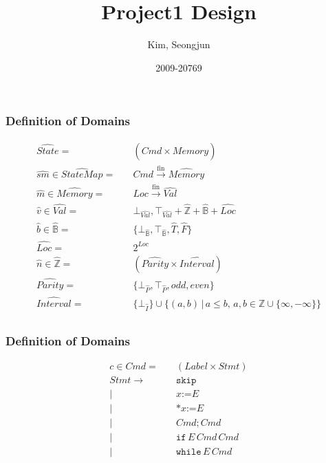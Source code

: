 \documentclass{beamer}
\title{Project1 Design}
\author{Kim, Seongjun}
\date{2009-20769}                                           %
\begin{document}
\maketitle

\begin{frame}
    \frametitle{Definition of Domains}
    \begin{align*}
        \hat{State}                     = & \quad (Cmd \times \hat{Memory}) \\
        \hat{sm} \in \hat{StateMap}             = & \quad Cmd \stackrel{\textrm{fin}}{\to} \hat{Memory} \\
        \hat{m} \in \hat{Memory}    = & \quad Loc \stackrel{\textrm{fin}}{\to} \hat{Val} \\
        \hat{v} \in \hat{Val}                   = & \quad \bot_{\hat{Val}}, \top_{\hat{Val}} + \hat{\mathbb{Z}} + \hat{\mathbb{B}} + \hat{Loc} \\
        \hat{b} \in \hat{\mathbb{B}}            = & \quad \{\bot_{\hat{\mathbb{B}}}, \top_{\hat{\mathbb{B}}}, \hat{T}, \hat{F}\} \\
        \hat{Loc}                   = & \quad 2^{Loc} \\
        \hat{n} \in \hat{\mathbb{Z}}            = & \quad (\hat{Parity} \times \hat{Interval}) \\
        \hat{Parity}    = & \quad \{ \bot_{\hat{P}}, \top_{\hat{P}}, odd, even \} \\
        \hat{Interval}  = & \quad \{ \bot_{\hat{I}} \} \cup \{(a, b) \, | \, a \le b, \, a, b \in \mathbb{Z} \cup \{\infty, -\infty  \} \} \\
    \end{align*}
\end{frame}

\begin{frame}
    \frametitle{Definition of Domains}
    \begin{align*}
        c \in Cmd = & \quad (Label \times Stmt) \\
        Stmt \to & \quad \texttt{skip} \\
               | & \quad x \texttt{:=} E \\
               | & \quad \texttt{*}x \texttt{:=} E \\
               | & \quad Cmd ; Cmd \\
               | & \quad \texttt{if} \, E \, Cmd \, Cmd \\
               | & \quad \texttt{while} \, E \, Cmd
    \end{align*}
\end{frame}
\end{document}
